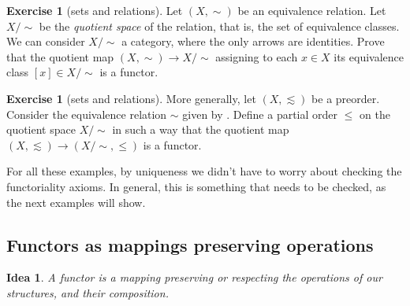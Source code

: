 \documentclass[a4paper,11pt,oneside]{scrbook}
\numberwithin{equation}{section}
\theoremstyle{plain}
\newtheorem*{idea}{Idea}
\theoremstyle{definition}
\newtheorem{ex}[thm]{Exercise}
\DeclareMathOperator{\1}{\mathbbm{1}}
\DeclareMathOperator{\2}{\mathbbm{2}}
\begin{document}
\begin{ex}[sets and relations]\label{quotient}
 Let $(X,\sim)$ be an equivalence relation. Let $X/\sim$ be the \emph{quotient space} of the relation, that is, the set of equivalence classes. We can consider $X/\sim$ a category, where the only arrows are identities. Prove that the quotient map $(X,\sim)\to X/\sim$ assigning to each $x\in X$ its equivalence class $[x]\in X/\sim$ is a functor.
\end{ex}

\begin{ex}[sets and relations]
 More generally, let $(X,\lesssim)$ be a preorder. Consider the equivalence relation $\sim$ given by . Define a partial order $\le$ on the quotient space $X/\sim$ in such a way that the quotient map $(X,\lesssim)\to (X/\sim, \le)$ is a functor. 
\end{ex}

For all these examples, by uniqueness we didn't have to worry about checking the functoriality axioms. In general, this is something that needs to be checked, as the next examples will show.


\subsection{Functors as mappings preserving operations}

\begin{idea}
 A functor is a mapping preserving or respecting the operations of our structures, and their composition.
\end{idea}
\end{document}
